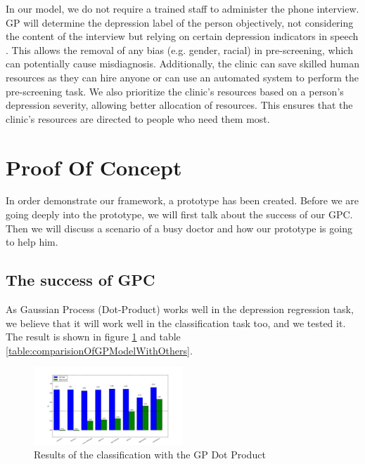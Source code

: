 \documentclass{article}
\begin{document}
    In our model, we do not require a trained staff to administer the phone interview. 
    GP will determine the depression label of the person objectively, not considering the content of the interview but relying on certain depression indicators in speech \cite{nimh2015}. 
    This allows the removal of any bias (e.g. gender, racial) in pre-screening, which can potentially cause misdiagnosis. 
    Additionally, the clinic can save skilled human resources as they can hire anyone or can use an automated system to perform the pre-screening task.
    We also prioritize the clinic's resources based on a person's depression severity, allowing better allocation of resources. 
    This ensures that the clinic's resources are directed to people who need them most.     

    \section{Proof Of Concept}
In order demonstrate our framework, a prototype has been created. Before we are going deeply into the prototype, 
    we will first talk about the success of our GPC. Then we will discuss a scenario of a busy doctor and how our prototype is going to help him.
    
    \subsection{The success of GPC}
    As Gaussian Process (Dot-Product) works well in the depression regression task, we believe that it will work well in the classification task too, and we tested it. 
    The result is shown in figure \ref{figure:gp_dot_product} and table \ref{table:comparisionOfGPModelWithOthers}. \\
         \begin{figure}[h]
             \begin{center}
            \includegraphics[width=0.5\textwidth]{gp_dot_product}
              \end{center}
              \caption{Results of the classification with the GP Dot Product}
              \label{figure:gp_dot_product}
      \end{figure}
\end{document}
